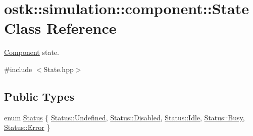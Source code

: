 \hypertarget{classostk_1_1simulation_1_1component_1_1_state}{}\section{ostk\+:\+:simulation\+:\+:component\+:\+:State Class Reference}
\label{classostk_1_1simulation_1_1component_1_1_state}


\hyperlink{classostk_1_1simulation_1_1_component}{Component} state.  




{\ttfamily \#include $<$State.\+hpp$>$}

\subsection*{Public Types}
\begin{DoxyCompactItemize}
\item 
enum \hyperlink{classostk_1_1simulation_1_1component_1_1_state_adb8b51feaa29b0ebd5fc7977fada7e58}{Status} \{ \newline
\hyperlink{classostk_1_1simulation_1_1component_1_1_state_adb8b51feaa29b0ebd5fc7977fada7e58aec0fc0100c4fc1ce4eea230c3dc10360}{Status\+::\+Undefined}, 
\hyperlink{classostk_1_1simulation_1_1component_1_1_state_adb8b51feaa29b0ebd5fc7977fada7e58ab9f5c797ebbf55adccdd8539a65a0241}{Status\+::\+Disabled}, 
\hyperlink{classostk_1_1simulation_1_1component_1_1_state_adb8b51feaa29b0ebd5fc7977fada7e58ae599161956d626eda4cb0a5ffb85271c}{Status\+::\+Idle}, 
\hyperlink{classostk_1_1simulation_1_1component_1_1_state_adb8b51feaa29b0ebd5fc7977fada7e58ad8a942ef2b04672adfafef0ad817a407}{Status\+::\+Busy}, 
\newline
\hyperlink{classostk_1_1simulation_1_1component_1_1_state_adb8b51feaa29b0ebd5fc7977fada7e58a902b0d55fddef6f8d651fe1035b7d4bd}{Status\+::\+Error}
 \}
\end{DoxyCompactItemize}
